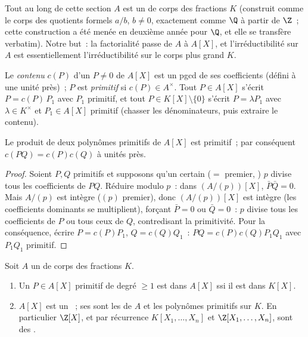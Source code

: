 Tout au long de cette section $A$ est un  de corps des
fractions $K$ (construit comme le corps des quotients formels
$a/b$, $b \neq 0$, exactement comme $\Q$ à partir de $\Z$~; cette
construction a été menée en deuxième année pour $\Q$, et elle se
transfère verbatim). Notre but~: la factorialité passe de $A$ à
$A[X]$, et l'irréductibilité sur $A$ est essentiellement
l'irréductibilité sur le corps plus grand $K$.

\begin{definition}\label{def:b3:rings:content}
Le \emph{contenu} $c(P)$ d'un $P
\neq 0$ de $A[X]$ est un pgcd de ses coefficients (défini à une
unité près)~; $P$ est \emph{primitif} si $c(P) \in A^\times$.
Tout $P \in A[X]$ s'écrit $P = c(P)\,P_1$ avec $P_1$ primitif, et
tout $P \in K[X]\setminus\{0\}$ s'écrit $P = \lambda P_1$ avec
$\lambda \in K^\times$ et $P_1 \in A[X]$ primitif (chasser les
dénominateurs, puis extraire le contenu).
\end{definition}

\begin{lemma}[Gauss]\label{lem:b3:rings:gauss}
Le produit de deux polynômes primitifs de $A[X]$ est primitif~;
par conséquent $c(PQ) = c(P)c(Q)$ à unités près.
\end{lemma}

\begin{proof}
Soient $P, Q$ primitifs et supposons qu'un certain 
($=$ premier, ) $p$ divise tous les coefficients de $PQ$.
Réduire modulo $p$~: dans $(A/(p))[X]$, $\bar P \bar Q = 0$.
Mais $A/(p)$ est intègre ($(p)$ premier), donc $(A/(p))[X]$ est
intègre (les coefficients dominants se multiplient), forçant
$\bar P = 0$ ou $\bar Q = 0$~: $p$ divise tous les coefficients
de $P$ ou tous ceux de $Q$, contredisant la primitivité. Pour la
conséquence, écrire $P = c(P)P_1$, $Q = c(Q)Q_1$~: $PQ =
c(P)c(Q) P_1Q_1$ avec $P_1Q_1$ primitif.
\end{proof}

\begin{theorem}\label{thm:b3:rings:gaussufd}
Soit $A$ un  de corps des fractions $K$.
\begin{enumerate}
  \item Un $P \in A[X]$ primitif de degré $\geq 1$ est
         dans $A[X]$ ssi il est  dans
        $K[X]$.
  \item $A[X]$ est un ~; ses  sont les
         de $A$ et les polynômes primitifs
         sur $K$. En particulier $\Z[X]$, et par
        récurrence $K[X_1, \dots, X_n]$ et $\Z[X_1, \dots,
        X_n]$, sont des .
\end{enumerate}
\end{theorem}

